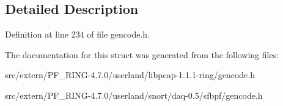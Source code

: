 \subsection{Detailed Description}


Definition at line 234 of file gencode.h.



The documentation for this struct was generated from the following files:\begin{DoxyCompactItemize}
\item 
src/extern/PF\_\-RING-\/4.7.0/userland/libpcap-\/1.1.1-\/ring/gencode.h\item 
src/extern/PF\_\-RING-\/4.7.0/userland/snort/daq-\/0.5/sfbpf/gencode.h\end{DoxyCompactItemize}
